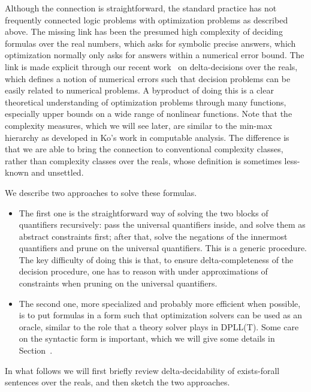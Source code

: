 \documentclass{llncs}
\begin{document}
Although the connection is straightforward, the standard practice has not frequently connected logic problems with optimization problems as described above. The missing link has been the presumed high complexity of deciding formulas over the real numbers, which asks for symbolic precise answers, which optimization normally only asks for answers within a numerical error bound. The link is made explicit through our recent work~\cite{} on delta-decisions over the reals, which defines a notion of numerical errors such that decision problems can be easily related to numerical problems. A byproduct of doing this is a clear theoretical understanding of optimization problems through many functions, especially upper bounds on a wide range of nonlinear functions. Note that the complexity measures, which we will see later, are similar to the min-max hierarchy as developed in Ko's work in computable analysis. The difference is that we are able to bring the connection to conventional complexity classes, rather than complexity classes over the reals, whose definition is sometimes less-known and unsettled. 

We describe two approaches to solve these formulas. 
\begin{itemize}
\item The first one is the straightforward way of solving the two blocks of quantifiers recursively: pass the universal quantifiers inside, and solve them as abstract constraints first; after that, solve the negations of the innermost quantifiers and prune on the universal quantifiers. This is a generic procedure. The key difficulty of doing this is that, to ensure delta-completeness of the decision procedure, one has to reason with under approximations of constraints when pruning on the universal quantifiers. 
\item The second one, more specialized and probably more efficient when possible, is to put formulas in a form such that optimization solvers can be used as an oracle, similar to the role that a theory solver plays in DPLL(T). Some care on the syntactic form is important, which we will give some details in Section~\cite{}. 
\end{itemize}

In what follows we will first briefly review delta-decidability of exists-forall sentences over the reals, and then sketch the two approaches. 
\end{document}
